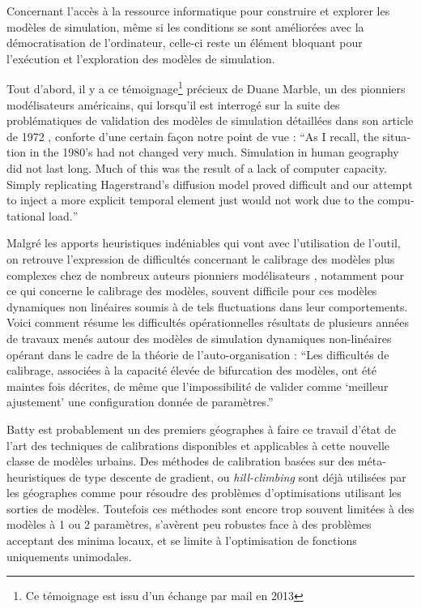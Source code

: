 Concernant l'accès à la ressource informatique pour construire et explorer les modèles de simulation, même si les conditions se sont améliorées avec la démocratisation de l'ordinateur, celle-ci reste un élément bloquant pour l'exécution et l'exploration des modèles de simulation.

Tout d'abord, il y a ce témoignage\footnote{Ce témoignage est issu d'un échange par mail en 2013} précieux de Duane Marble, un des pionniers modélisateurs américains, qui lorsqu'il est interrogé sur la suite des problématiques de validation des modèles de simulation détaillées dans son article de 1972 \autocite{Marble1972}, conforte d'une certain façon notre point de vue : \foreignquote{english}{As I recall, the situation in the 1980's had not changed very much. Simulation in human geography did not last long. Much of this was the result of a lack of computer capacity. Simply replicating Hagerstrand's diffusion model proved difficult and our attempt to inject a more explicit temporal element just would not work due to the computational load.}

Malgré les apports heuristiques indéniables qui vont avec l'utilisation de l'outil, on retrouve l'expression de difficultés concernant le calibrage des modèles plus complexes chez de nombreux auteurs pionniers modélisateurs \autocites{Batty1976, Pumain1998a}[400]{Sanders1984}, notamment pour ce qui concerne le calibrage des modèles, souvent difficile pour ces modèles dynamiques non linéaires soumis à de tels fluctuations dans leur comportements. Voici comment \autocite{Pumain1998a} résume les difficultés opérationnelles résultats de plusieurs années de travaux menés autour des modèles de simulation dynamiques non-linéaires opérant dans le cadre de la théorie de l'auto-organisation : \enquote{Les difficultés de calibrage, associées à la capacité élevée de bifurcation des modèles, ont été maintes fois décrites, de même que l’impossibilité de valider comme \enquote{meilleur ajustement} une configuration donnée de paramètres.}

Batty est probablement un des premiers géographes à faire ce travail d'état de l'art des techniques de calibrations disponibles et applicables à cette nouvelle classe de modèles urbains. Des méthodes de calibration basées sur des méta-heuristiques de type descente de gradient, ou \textit{hill-climbing} sont déjà utilisées par les géographes comme \textcite[159-160]{Batty1976} pour résoudre des problèmes d'optimisations utilisant les sorties de modèles. Toutefois ces méthodes sont encore trop souvent limitées à des modèles à 1 ou 2 paramètres, s'avèrent peu robustes face à des problèmes acceptant des minima locaux, et se limite à l'optimisation de fonctions uniquements unimodales. 

